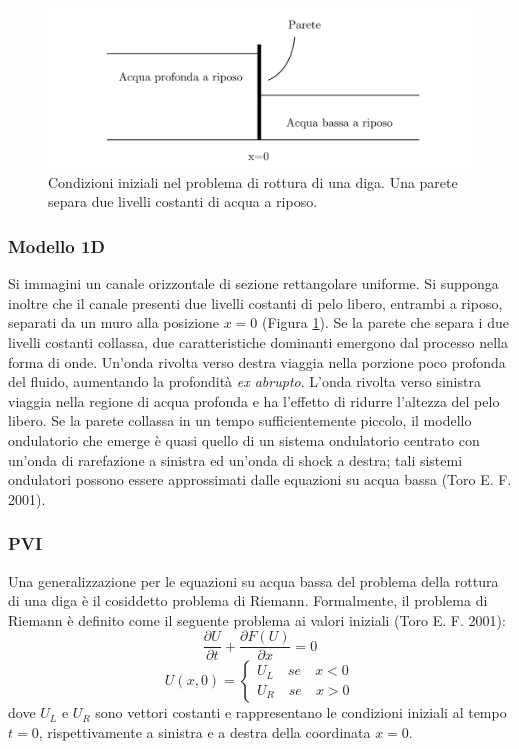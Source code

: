 \documentclass[12pt]{article} %
\begin{document}
\begin{figure} [H]
    \centering
    \includegraphics[width=0.6\columnwidth]{Dam Break.png}
    \caption{Condizioni iniziali nel problema di rottura di una diga. Una parete separa due livelli costanti di acqua a riposo.}
    \label{fig:Dam Break}
\end{figure}

\subsubsection{Modello 1D}
\noindent Si immagini un canale orizzontale di sezione rettangolare uniforme. Si supponga inoltre che il canale presenti due livelli costanti di pelo libero, entrambi a riposo, separati da un muro alla posizione $x=0$ (Figura \ref{fig:Dam Break}).
\noindent Se la parete che separa i due livelli costanti collassa, due caratteristiche dominanti emergono dal processo nella forma di onde. Un'onda rivolta verso destra viaggia nella porzione poco profonda del fluido, aumentando la profondità \textit{ex abrupto}. L'onda rivolta verso sinistra viaggia nella regione di acqua profonda e ha l'effetto di ridurre l'altezza del pelo libero. Se la parete collassa in un tempo sufficientemente piccolo, il modello ondulatorio che emerge è quasi quello di un sistema ondulatorio centrato con un'onda di rarefazione a sinistra ed un'onda di shock a destra; tali sistemi ondulatori possono essere approssimati dalle equazioni su acqua bassa (Toro E. F. 2001).
\subsubsection{PVI}
\noindent Una generalizzazione per le equazioni su acqua bassa del problema della rottura di una diga è il cosiddetto problema di Riemann. Formalmente, il problema di Riemann è definito come il seguente problema ai valori iniziali (Toro E. F. 2001):
\begin{equation}
    \frac{\partial U}{\partial t}+\frac{\partial F(U)}{\partial x}=0
    \label{eqn:Riemann}
\end{equation}
\begin{equation}
    U(x,0)=\begin{cases}U_L\quad se\quad x<0\\
    U_R\quad se\quad x>0
    \end{cases}
    \label{eqn:Riemann_cond_iniziali}
\end{equation}
\noindent dove $U_L$ e $U_R$ sono vettori costanti e rappresentano le condizioni iniziali al tempo $t=0$, rispettivamente a sinistra e a destra della coordinata $x=0$.
\newpage
\end{document}
